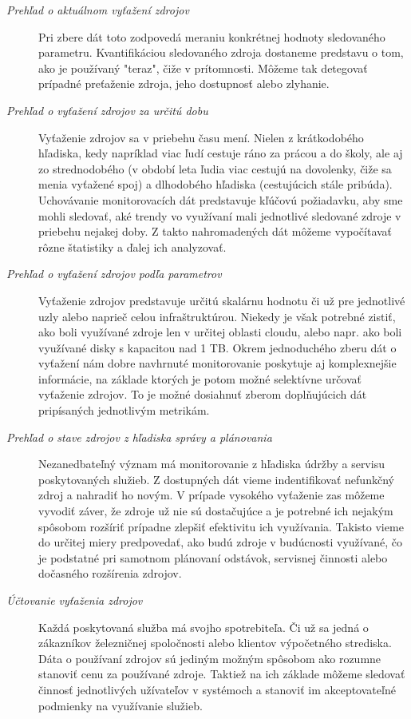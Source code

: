 \documentclass[11pt,final,oneside]{fithesis}
\begin{document}
\begin{description}
\item[\emph{Prehľad o aktuálnom vyťažení zdrojov}]
Pri zbere dát toto zodpovedá meraniu konkrétnej hodnoty sledovaného parametru. Kvantifikáciou sledovaného zdroja dostaneme predstavu o tom, ako je používaný "teraz", čiže v prítomnosti. Môžeme tak detegovať prípadné
preťaženie zdroja, jeho dostupnosť alebo zlyhanie.
\item[\emph{Prehľad o vyťažení zdrojov za určitú dobu}]
Vyťaženie zdrojov sa v priebehu času mení. Nielen z krátkodobého hľadiska, kedy napríklad viac ľudí cestuje ráno za prácou a do školy, ale aj zo strednodobého (v období leta ľudia viac cestujú na dovolenky, čiže sa menia 
vyťažené spoj) a dlhodobého hľadiska (cestujúcich stále pribúda). Uchovávanie monitorovacích dát predstavuje kľúčovú požiadavku, aby sme mohli sledovať, aké trendy vo využívaní mali jednotlivé sledované zdroje v priebehu nejakej doby.
Z takto nahromadených dát môžeme vypočítavať rôzne štatistiky a ďalej ich analyzovať.
\item[\emph{Prehľad o vyťažení zdrojov podľa parametrov}]
Vyťaženie zdrojov predstavuje určitú skalárnu hodnotu či už pre jednotlivé uzly alebo naprieč celou infraštruktúrou. Niekedy je však potrebné zistiť, ako boli využívané zdroje len v určitej oblasti cloudu,
alebo napr. ako boli využívané disky s kapacitou nad 1 TB. Okrem jednoduchého zberu dát o vyťažení nám dobre navhrnuté monitorovanie poskytuje aj komplexnejšie informácie, na základe ktorých je potom možné
selektívne určovať vyťaženie zdrojov. To je možné dosiahnuť zberom doplňujúcich dát pripísaných jednotlivým metrikám.
\item[\emph{Prehľad o stave zdrojov z hľadiska správy a plánovania}]
Nezanedbateľný význam má monitorovanie z hľadiska údržby a servisu poskytovaných služieb. Z dostupných dát vieme indentifikovať nefunkčný zdroj a nahradiť ho novým. V prípade vysokého vyťaženie zas môžeme vyvodiť záver, že zdroje už nie sú
dostačujúce a je potrebné ich nejakým spôsobom rozšíriť prípadne zlepšiť efektivitu ich využívania. Takisto vieme do určitej miery predpovedať, ako budú zdroje v budúcnosti využívané, čo je podstatné pri samotnom plánovaní 
odstávok, servisnej činnosti alebo dočasného rozšírenia zdrojov.
\item[\emph{Účtovanie vyťaženia zdrojov}]
Každá poskytovaná služba má svojho spotrebiteľa. Či už sa jedná o zákazníkov železničnej spoločnosti alebo klientov výpočetného strediska. Dáta o používaní zdrojov sú jediným možným spôsobom ako rozumne stanoviť cenu za používané zdroje.
Taktiež na ich základe môžeme sledovať činnosť jednotlivých užívateľov v systémoch a stanoviť im akceptovateľné podmienky na využívanie služieb.
\end{description}
\end{document}
